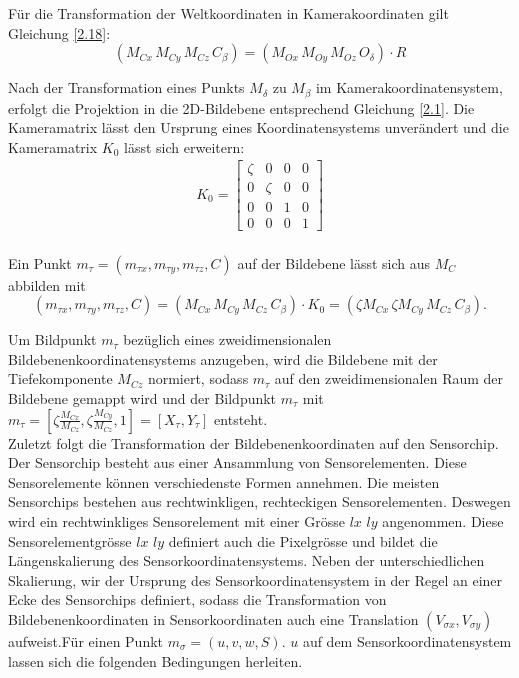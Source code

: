 Für die Transformation der Weltkoordinaten in Kamerakoordinaten gilt Gleichung \ref{2.18}:
\begin{equation}
({M_{Cx}}\,{M_{Cy}}\, {M_{Cz}}\, C_{\beta})=({M_{Ox}}\,{M_{Oy}}\,{M_{Oz}}\,O_{\delta}) \cdot R
\end{equation}

Nach der Transformation eines Punkts $M_\delta$ zu $M_\beta$ im Kamerakoordinatensystem, erfolgt die Projektion in die 2D-Bildebene entsprechend Gleichung \ref{2.1}. Die Kameramatrix lässt den Ursprung eines Koordinatensystems unverändert und die Kameramatrix $K_0$ lässt sich erweitern:
\begin{gather}
	K_0 = 
	\begin{bmatrix}
		\zeta&0&0&0\\
		0&\zeta&0&0\\
		0&0&1&0\\
		0&0&0&1
	\end{bmatrix}\\
\end{gather}

Ein Punkt $m_\tau=(m_{\tau x},m_{\tau y},m_{\tau z},C)$ auf der Bildebene lässt sich aus $M_C$ abbilden mit
\begin{equation}
(m_{\tau x},m_{\tau y},m_{\tau z},C)=({M_{Cx}}\,{M_{Cy}}\, {M_{Cz}}\, C_{\beta}) \cdot K_0 = (\zeta {M_{Cx}}\,\zeta{M_{Cy}}\, {M_{Cz}}\, C_{\beta}).
\end{equation}

Um Bildpunkt $m_\tau$ bezüglich eines zweidimensionalen Bildebenenkoordinatensystems anzugeben, wird die Bildebene mit der Tiefekomponente $M_{Cz}$ normiert, sodass $m_\tau$ auf den zweidimensionalen Raum der Bildebene gemappt wird und der Bildpunkt $m_\tau$ mit $m_\tau = [\zeta \frac{M_{Cx}}{M_{Cz}},\zeta\frac{M_{Cy}}{M_{Cz}},1] = [X_\tau, Y_\tau]$ entsteht.\\

Zuletzt folgt die Transformation der Bildebenenkoordinaten auf den Sensorchip. Der Sensorchip besteht aus einer Ansammlung von Sensorelementen. Diese Sensorelemente können verschiedenste Formen annehmen. Die meisten Sensorchips bestehen aus rechtwinkligen, rechteckigen Sensorelementen. Deswegen wird ein rechtwinkliges Sensorelement mit einer Grösse $lx$ $ly$ angenommen. Diese Sensorelementgrösse $lx$ $ly$ definiert auch die Pixelgrösse und bildet die Längenskalierung des Sensorkoordinatensystems. Neben der unterschiedlichen Skalierung, wir der Ursprung des Sensorkoordinatensystem in der Regel an einer Ecke des Sensorchips definiert, sodass die Transformation von Bildebenenkoordinaten in Sensorkoordinaten auch eine Translation $(V_{\sigma x},V_{\sigma y})$ aufweist.Für einen Punkt $m_\sigma = ({u},{v},{w},S)$. ${u}$ auf dem Sensorkoordinatensystem lassen sich die folgenden Bedingungen herleiten. %

